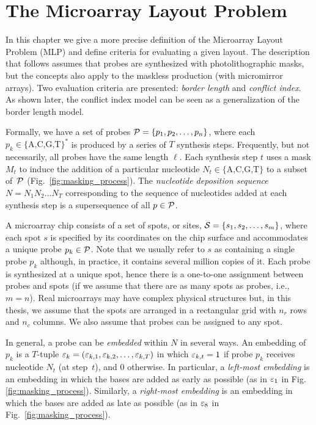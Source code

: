 \chapter{The Microarray Layout Problem}
\label{ch:mlp}

In this chapter we give a more precise definition of the Microarray Layout
Problem (MLP) and define criteria for evaluating a given layout. The description
that follows assumes that probes are synthesized with photolithographic masks,
but the concepts also apply to the maskless production (with micromirror
arrays). Two evaluation criteria are presented: \emph{border length} and \emph{
conflict index}. As shown later, the conflict index model can be seen as a
generalization of the border length model.

Formally, we have a set of probes ${\mathcal{P}} = \{p_{1}, p_{2}, \dots, p_{n}\}$,
where each $p_k \in \{\text{A,C,G,T}\}^\ast$ is produced by a series of $T$
synthesis steps. Frequently, but not necessarily, all probes have the same
length $\ell$. Each synthesis step $t$ uses a mask $M_t$ to induce the addition
of a particular nucleotide $N_t \in \{\text{A,C,G,T}\}$ to a subset of~${\mathcal{P}}$
(Fig.~\ref{fig:masking_process}). The \emph{nucleotide deposition sequence}
$N = N_{1} N_{2} \ldots N_{T}$ corresponding to the sequence of nucleotides
added at each synthesis step is a supersequence of all $p \in {\mathcal{P}}$.

A microarray chip consists of a set of spots, or sites,
${\mathcal{S}} = \{s_{1}, s_{2}, \dots, s_{m}\}$, where each spot $s$ is specified by
its coordinates on the chip surface and accommodates a unique probe
$p_k \in {\mathcal{P}}$. Note that we usually refer to $s$ as containing a single probe
$p_k$ although, in practice, it contains several million copies of it. Each
probe is synthesized at a unique spot, hence there is a one-to-one assignment
between probes and spots (if we assume that there are as many spots as probes,
i.e., $m=n$). Real microarrays may have complex physical structures but, in this
thesis, we assume that the spots are arranged in a rectangular grid with
$n_r$ rows and $n_c$ columns. We also assume that probes can be assigned to any
spot.

In general, a probe can be \emph{embedded} within $N$ in several ways. An
embedding of $p_{k}$ is a $T$-tuple
$\varepsilon_{k} = (\varepsilon_{k,1}, \varepsilon_{k,2}, \dots, \varepsilon_{k,T})$ in which
$\varepsilon_{k,t} = 1$ if probe $p_{k}$ receives nucleotide $N_{t}$ (at step~$t$), and
0 otherwise. In particular, a \emph{left-most embedding} is an embedding in
which the bases are added as early as possible (as in $\varepsilon_1$ in Fig.~
\ref{fig:masking_process}). Similarly, a \emph{right-most embedding} is an
embedding in which the bases are added as late as possible (as in $\varepsilon_8$ in
Fig.~\ref{fig:masking_process}).

